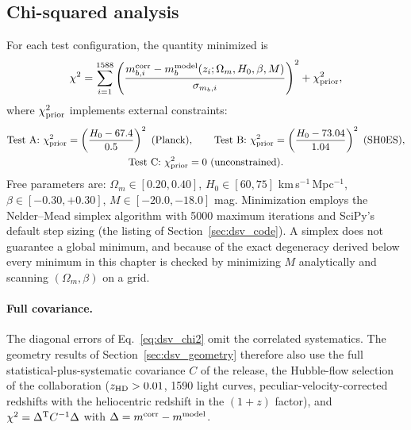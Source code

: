 \subsection{Chi-squared analysis}
For each test configuration, the quantity minimized is
\begin{equation}
\chi^2=\sum_{i=1}^{1588}\left(\frac{m_{b,i}^{\rm corr}-m_b^{\rm model}(z_i;\Omega_m,H_0,\beta,M)}{\sigma_{m_b,i}}\right)^2+\chi^2_{\rm prior}, \label{eq:dsv_chi2}
\end{equation}
where $\chi^2_{\rm prior}$ implements external constraints:
\begin{equation}\begin{gathered}
\text{Test A: }\chi^2_{\rm prior}=\left(\frac{H_0-67.4}{0.5}\right)^2\ \text{(Planck)},\qquad \text{Test B: }\chi^2_{\rm prior}=\left(\frac{H_0-73.04}{1.04}\right)^2\ \text{(SH0ES)},\\
\text{Test C: }\chi^2_{\rm prior}=0\ \text{(unconstrained)}.
\end{gathered}\label{eq:dsv_priors}\end{equation}
Free parameters are: $\Omega_m\in[0.20,0.40]$, $H_0\in[60,75]$ km\,s$^{-1}$\,Mpc$^{-1}$, $\beta\in[-0.30,+0.30]$, $M\in[-20.0,-18.0]$ mag.
Minimization employs the Nelder--Mead simplex algorithm with 5000 maximum iterations and SciPy's default step sizing (the listing of Section~\ref{sec:dsv_code}). A simplex does not guarantee a global
minimum, and because of the exact degeneracy derived below every minimum in this chapter is checked by minimizing $M$ analytically and scanning
$(\Omega_m,\beta)$ on a grid. \derived{}

\paragraph{Full covariance.} The diagonal errors of Eq.~\eqref{eq:dsv_chi2} omit the correlated systematics. The geometry results of
Section~\ref{sec:dsv_geometry} therefore also use the full statistical-plus-systematic covariance $C$ of the release, the Hubble-flow selection of the
collaboration ($z_{\rm HD}>0.01$, 1590 light curves, peculiar-velocity-corrected redshifts with the heliocentric redshift in the $(1+z)$ factor), and
$\chi^2=\Delta^{\rm T}C^{-1}\Delta$ with $\Delta=m^{\rm corr}-m^{\rm model}$.

